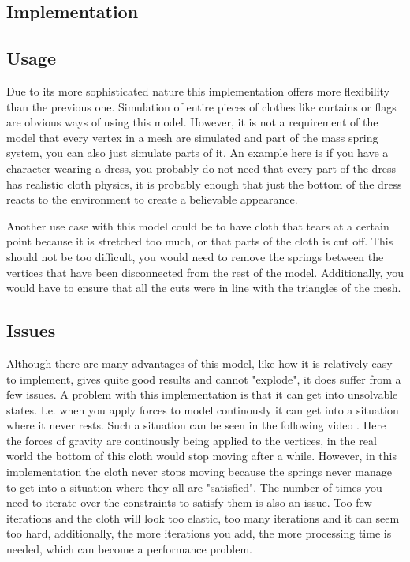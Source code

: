 %

\subsection{Implementation}

\subsection{Usage}
Due to its more sophisticated nature this implementation offers more flexibility than the previous one.
Simulation of entire pieces of clothes like curtains or flags are obvious ways of using this model.
However, it is not a requirement of the model that every vertex in a mesh are simulated and part of the mass spring system, you can also just simulate parts of it.
An example here is if you have a character wearing a dress, you probably do not need that every part of the dress
has realistic cloth physics, it is probably enough that just the bottom of the dress reacts to the environment
to create a believable appearance.

Another use case with this model could be to have cloth that tears at a certain point because it is stretched too much,
or that parts of the cloth is cut off. This should not be too difficult, you would need to remove the springs between
the vertices that have been disconnected from the rest of the model.
Additionally, you would have to ensure that all the cuts were in line with the triangles of the mesh.

\subsection{Issues}
Although there are many advantages of this model, like how it is relatively easy to implement, gives quite good results and cannot "explode", it does suffer from a few issues.
A problem with this implementation is that it can get into unsolvable states.
I.e. when you apply forces to model continously it can get into a situation where it never rests.
Such a situation can be seen in the following video .
Here the forces of gravity are continously being applied to the vertices, in the real world the bottom
of this cloth would stop moving after a while. However, in this implementation the cloth never stops moving
because the springs never manage to get into a situation where they all are "satisfied".
The number of times you need to iterate over the constraints to satisfy them is also an issue.
Too few iterations and the cloth will look too elastic, too many iterations and it can seem too hard,
additionally, the more iterations you add, the more processing time is needed, which can become a performance problem.

